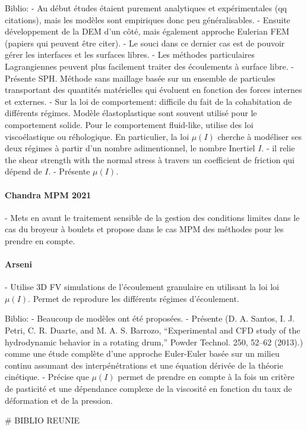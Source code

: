 Biblio:
- Au début études étaient purement analytiques et expérimentales (qq citations), mais les modèles sont empiriques donc peu généralisables.
- Ensuite développement de la DEM d'un côté, mais également approche Eulerian FEM (papiers qui peuvent être citer).
- Le souci dans ce dernier cas est de pouvoir gérer les interfaces et les surfaces libres.
- Les méthodes particulaires Lagrangiennes peuvent plus facilement traiter des écoulements à surface libre.
- Présente SPH. Méthode sans maillage basée sur un ensemble de particules transportant des quantités matérielles qui évoluent en fonction des forces internes et externes.
- Sur la loi de comportement: difficile du fait de la cohabitation de différents régimes. Modèle élastoplastique sont souvent utilisé pour le comportement solide. Pour le comportement fluid-like, utilise des loi viscoélastique ou réhologique. En particulier, la loi $\mu (I)$ cherche à modéliser ses deux régimes à partir d'un nombre adimentionnel, le nombre Inertiel $I$.
- il relie the shear strength with the normal stress à travers un coefficient de friction qui dépend de $I$.
- Présente $\mu(I)$.

\paragraph*{Chandra MPM 2021}
- Mets en avant le traitement sensible de la gestion des conditions limites dans le cas du broyeur à boulets et propose dans le cas MPM des méthodes pour les prendre en compte.

\paragraph*{Arseni}
- Utilise 3D FV simulations de l'écoulement granulaire en utilisant la loi loi $\mu(I)$. Permet de reprodure les différents régimes d'écoulement.

Biblio:
- Beaucoup de modèles ont été proposées.
- Présente (D. A. Santos, I. J. Petri, C. R. Duarte, and M. A. S. Barrozo, “Experimental and CFD study of the hydrodynamic behavior in a rotating drum,” Powder Technol. 250, 52–62 (2013).) comme une étude complète d'une approche Euler-Euler basée sur un milieu continu assumant des interpénétrations et une équation dérivée de la théorie cinétique.
- Précise que $\mu(I)$ permet de prendre en compte à la fois un critère de pasticité et une dépendance complexe de la viscosité en fonction du taux de déformation et de la pression.

# BIBLIO REUNIE

